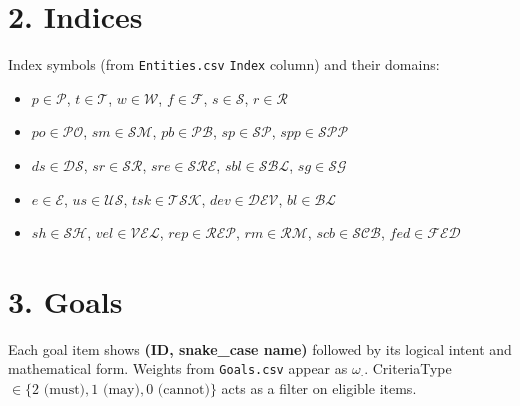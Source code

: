 \documentclass[11pt,a4paper]{article}
\begin{document}
\section{2. Indices}
Index symbols (from \texttt{Entities.csv} \texttt{Index} column) and their domains:
\begin{itemize}[leftmargin=2em]
  \item \(p\in\mathcal{P}\), \(t\in\mathcal{T}\), \(w\in\mathcal{W}\), \(f\in\mathcal{F}\), \(s\in\mathcal{S}\), \(r\in\mathcal{R}\)
  \item \(po\in\mathcal{PO}\), \(sm\in\mathcal{SM}\), \(pb\in\mathcal{PB}\), \(sp\in\mathcal{SP}\), \(spp\in\mathcal{SPP}\)
  \item \(ds\in\mathcal{DS}\), \(sr\in\mathcal{SR}\), \(sre\in\mathcal{SRE}\), \(sbl\in\mathcal{SBL}\), \(sg\in\mathcal{SG}\)
  \item \(e\in\mathcal{E}\), \(us\in\mathcal{US}\), \(tsk\in\mathcal{TSK}\), \(dev\in\mathcal{DEV}\), \(bl\in\mathcal{BL}\)
  \item \(sh\in\mathcal{SH}\), \(vel\in\mathcal{VEL}\), \(rep\in\mathcal{REP}\), \(rm\in\mathcal{RM}\), \(scb\in\mathcal{SCB}\), \(fed\in\mathcal{FED}\)
\end{itemize}

\section{3. Goals}
Each goal item shows \textbf{(ID, snake\_case name)} followed by its logical intent and mathematical form. Weights from \texttt{Goals.csv} appear as \(\omega_{\cdot}\). CriteriaType \(\in\{2\text{ (must)},1\text{ (may)},0\text{ (cannot)}\}\) acts as a filter on eligible items.
\end{document}
